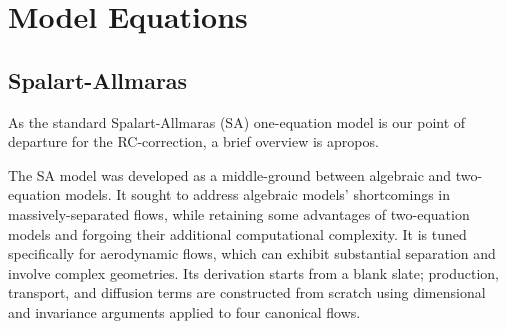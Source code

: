 \documentclass[11pt]{article}
\begin{document}
\section{Model Equations} %

\subsection{Spalart-Allmaras}

As the standard Spalart-Allmaras (SA) one-equation model \cite{spalart1992} is our point of departure for the RC-correction, a brief overview is apropos.

The SA model was developed as a middle-ground between algebraic and two-equation models. It sought to address algebraic models' shortcomings in massively-separated flows, while retaining some advantages of two-equation models and forgoing their additional computational complexity. It is tuned specifically for aerodynamic flows, which can exhibit substantial separation and involve complex geometries. Its derivation starts from a blank slate; production, transport, and diffusion terms are constructed from scratch using dimensional and invariance arguments applied to four canonical flows.
\end{document}
